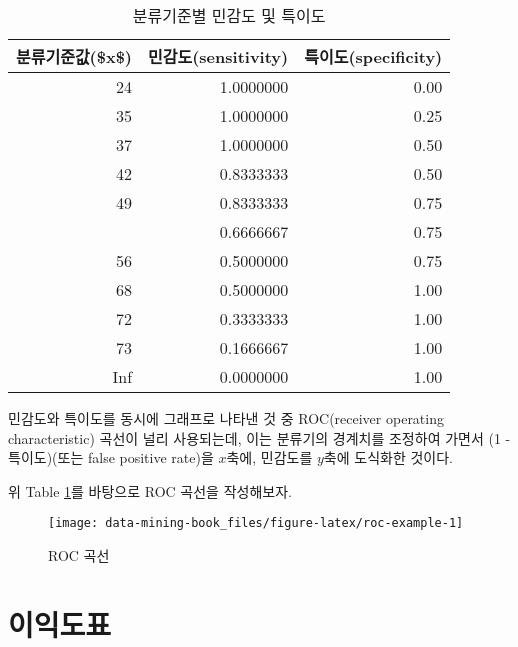 \documentclass[]{book}
\newenvironment{Shaded}{\begin{snugshade}}{\end{snugshade}}
\newcommand{\DataTypeTok}[1]{\textcolor[rgb]{0.13,0.29,0.53}{#1}}
\newcommand{\DecValTok}[1]{\textcolor[rgb]{0.00,0.00,0.81}{#1}}
\newcommand{\KeywordTok}[1]{\textcolor[rgb]{0.13,0.29,0.53}{\textbf{#1}}}
\newcommand{\NormalTok}[1]{#1}
\newcommand{\OperatorTok}[1]{\textcolor[rgb]{0.81,0.36,0.00}{\textbf{#1}}}
\newcommand{\StringTok}[1]{\textcolor[rgb]{0.31,0.60,0.02}{#1}}
\begin{document}
\begin{table}[t]

\caption{\label{tab:roc-data}분류기준별 민감도 및 특이도}
\centering
\begin{tabular}{rrr}
\toprule
분류기준값(\$x\$) & 민감도(sensitivity) & 특이도(specificity)\\
\midrule
24 & 1.0000000 & 0.00\\
35 & 1.0000000 & 0.25\\
37 & 1.0000000 & 0.50\\
42 & 0.8333333 & 0.50\\
49 & 0.8333333 & 0.75\\
\addlinespace
54 & 0.6666667 & 0.75\\
56 & 0.5000000 & 0.75\\
68 & 0.5000000 & 1.00\\
72 & 0.3333333 & 1.00\\
73 & 0.1666667 & 1.00\\
\addlinespace
Inf & 0.0000000 & 1.00\\
\bottomrule
\end{tabular}
\end{table}

민감도와 특이도를 동시에 그래프로 나타낸 것 중 ROC(receiver operating characteristic) 곡선이 널리 사용되는데, 이는 분류기의 경계치를 조정하여 가면서 (1 - 특이도)(또는 false positive rate)을 \(x\)축에, 민감도를 \(y\)축에 도식화한 것이다.

위 Table \ref{tab:roc-data}를 바탕으로 ROC 곡선을 작성해보자.

\begin{Shaded}
\end{Shaded}

\begin{figure}

{\centering \texttt{[image: data-mining-book\_files/figure-latex/roc-example-1]} 

}

\caption{ROC 곡선}\label{fig:roc-example}
\end{figure}

\hypertarget{gain-chart}{%
\section{이익도표}\label{gain-chart}}
\end{document}
